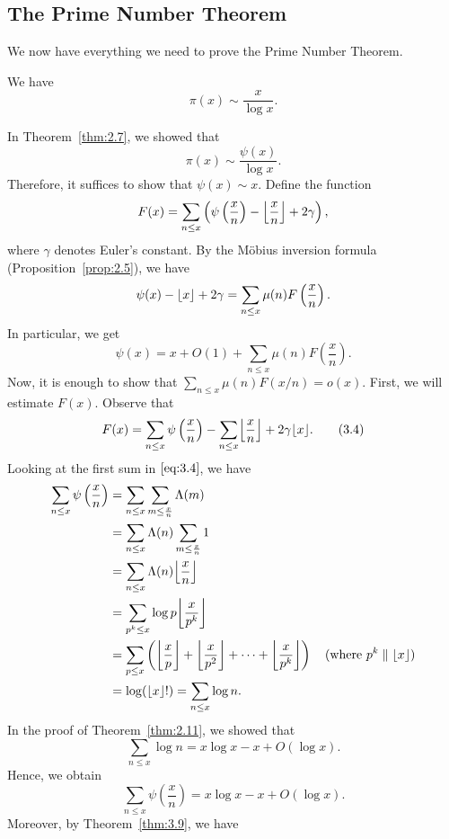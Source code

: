 \subsection{The Prime Number Theorem}\label{subsec:3.5}
We now have everything we need to prove the Prime Number Theorem. 

\begin{thm}\label{thm:3.10}
    We have 
    \[ \pi(x) \sim \frac{x}{\log x}. \] 
\end{thm}
\begin{pf}
    In Theorem~\ref{thm:2.7}, we showed that 
    \[ \pi(x) \sim \frac{\psi(x)}{\log x}. \] 
    Therefore, it suffices to show that $\psi(x) \sim x$. Define the function 
    \[ F(x) = \sum_{n\leq x} \left( \psi\left( \frac xn \right) - \floor*{\frac xn}
    + 2\gamma \right), \] 
    where $\gamma$ denotes Euler's constant. By the M\"obius inversion formula 
    (Proposition~\ref{prop:2.5}), we have 
    \[ \psi(x) - \floor{x} + 2\gamma = \sum_{n\leq x} \mu(n) F\left( \frac xn \right). \] 
    In particular, we get 
    \[ \psi(x) = x + O(1) + \sum_{n \leq x} \mu(n) F\left( \frac xn \right). \] 
    Now, it is enough to show that $\sum_{n\leq x} \mu(n) F(x/n) = o(x)$. First, 
    we will estimate $F(x)$. Observe that 
    \[ F(x) = \sum_{n\leq x} \psi\left( \frac xn \right) - \sum_{n \leq x} 
    \floor*{\frac xn} + 2\gamma\floor{x}. \tag{3.4}\label{eq:3.4} \]
    Looking at the first sum in $\eqref{eq:3.4}$, we have 
    \begin{align*}
        \sum_{n\leq x} \psi\left( \frac xn \right) 
        &= \sum_{n \leq x} \sum_{m \leq \frac xn} \Lambda(m) \\
        &= \sum_{n \leq x} \Lambda(n) \sum_{m\leq \frac xn} 1 \\
        &= \sum_{n \leq x} \Lambda(n) \floor*{\frac xn} \\
        &= \sum_{p^k \leq x} \log p \floor*{\frac x{p^k}} \\ 
        &= \sum_{p \leq x} \left( \floor*{\frac xp} + \floor*{\frac x{p^2}} 
        + \cdots + \floor*{\frac x{p^k}} \right) \quad \text{(where $p^k\;\|\;\floor{x}$)} \\
        &= \log(\floor{x}!) = \sum_{n \leq x} \log n. 
    \end{align*}
    In the proof of Theorem~\ref{thm:2.11}, we showed that 
    \[ \sum_{n\leq x} \log n = x\log x - x + O(\log x). \] 
    Hence, we obtain 
    \[ \sum_{n\leq x} \psi\left( \frac xn \right) = x\log x - x + O(\log x). \tag{3.5}\label{eq:3.5} \] 
    Moreover, by Theorem~\ref{thm:3.9}, we have 

\end{pf}
